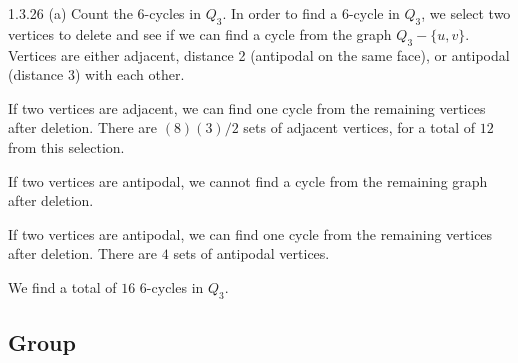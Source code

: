 \documentclass[9pt]{extarticle}
\begin{document}
  \begin{problem}{1.3.26 (a)}
    Count the $6$-cycles in $Q_3$.
    \tcblower
    In order to find a $6$-cycle in $Q_3$, we select two vertices to delete and see if we can find a cycle from the graph $Q_3 - \{u,v\}$. Vertices are either adjacent, distance 2 (antipodal on the same face), or antipodal (distance 3) with each other.
    \begin{description}[font=\normalfont\scshape]
      \item[Adjacent:] If two vertices are adjacent, we can find one cycle from the remaining vertices after deletion. There are $(8)(3)/2$ sets of adjacent vertices, for a total of $12$ from this selection.
      \item[Antipodal on the same face:] If two vertices are antipodal, we cannot find a cycle from the remaining graph after deletion.
      \item[Antipodal:] If two vertices are antipodal, we can find one cycle from the remaining vertices after deletion. There are $4$ sets of antipodal vertices.
    \end{description}
    We find a total of $16$ $6$-cycles in $Q_3$.
  \end{problem}
  \subsection*{Group}%
  
\end{document}
